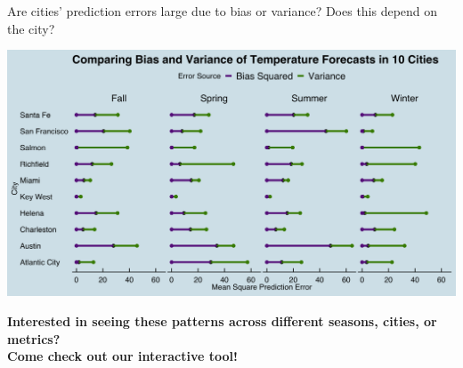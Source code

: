 \documentclass[handout,t]{beamer}
\begin{document}
\section{}
\begin{frame}{Are cities' prediction errors large due to bias or variance? Does this depend on the city?
}
  \begin{center}
  \includegraphics[scale=0.06]{BiasVarGraph.png}
  \end{center}
\end{frame}

\begin{frame}
\vspace{0.8 in}
  \begin{center}
  \bf{\large{Interested in seeing these patterns across different seasons, cities, or metrics? \\ \vspace{0.2in} Come check out our interactive tool!}}
  \end{center}

\end{frame}
\end{document}
